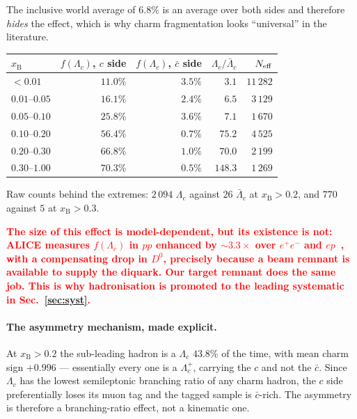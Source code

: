 \documentclass[11pt,a4paper]{article}
\newcommand{\xB}{x_{\mathrm{B}}}
\newcommand{\note}[1]{\textcolor{red}{\textbf{#1}}}
\begin{document}
The inclusive world average of $6.8\%$ is an average over both sides and
therefore \emph{hides} the effect, which is why charm fragmentation looks
``universal'' in the literature.

\begin{center}\small
\begin{tabular}{lrrrr}
\toprule
$\xB$ & $f(\Lambda_c)$, $c$ side & $f(\Lambda_c)$, $\bar{c}$ side & $\Lambda_c/\bar\Lambda_c$ & $N_{\rm eff}$ \\
\midrule
$<0.01$        & $11.0\%$ & $3.5\%$ & $3.1$ & $11\,282$ \\
$0.01$--$0.05$ & $16.1\%$ & $2.4\%$ & $6.5$ & $3\,129$ \\
$0.05$--$0.10$ & $25.8\%$ & $3.6\%$ & $7.1$ & $1\,670$ \\
$0.10$--$0.20$ & $56.4\%$ & $0.7\%$ & $75.2$ & $4\,525$ \\
$0.20$--$0.30$ & $66.8\%$ & $1.0\%$ & $70.0$ & $2\,199$ \\
$0.30$--$1.00$ & $\mathbf{70.3\%}$ & $0.5\%$ & $\mathbf{148.3}$ & $1\,269$ \\
\bottomrule
\end{tabular}
\end{center}

\noindent
Raw counts behind the extremes: $2\,094$ $\Lambda_c$ against $26$
$\bar\Lambda_c$ at $\xB>0.2$, and $770$ against $5$ at $\xB>0.3$.

\note{The size of this effect is model-dependent, but its existence is not:
ALICE measures $f(\Lambda_c)$ in $pp$ enhanced by ${\sim}3.3\times$ over
$e^+e^-$ and $ep$~\cite{alicepp,alicebaryon}, with a compensating drop in $D^0$,
precisely because a beam remnant is available to supply the diquark. Our target
remnant does the same job. This is why hadronisation is promoted to the leading
systematic in Sec.~\ref{sec:syst}.}

\paragraph{The asymmetry mechanism, made explicit.} At $\xB>0.2$ the sub-leading
hadron is a $\Lambda_c$ $43.8\%$ of the time, with mean charm sign $+0.996$ ---
essentially every one is a $\Lambda_c^+$, carrying the $c$ and not the $\bar{c}$.
Since $\Lambda_c$ has the lowest semileptonic branching ratio of any charm hadron,
the $c$ side preferentially loses its muon tag and the tagged sample is
$\bar{c}$-rich. The asymmetry is therefore a branching-ratio effect, not a
kinematic one.
\end{document}
